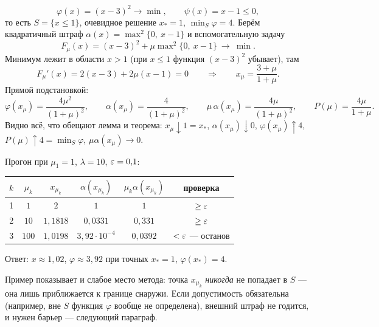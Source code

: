 \begin{example}\label{ex:penalty}
\[
  \varphi(x) = (x-3)^2 \to \min , \qquad \psi(x) = x - 1 \le 0 ,
\]
то есть $S = \{x \le 1\}$, очевидное решение $x_* = 1$,
$\min_S\varphi = 4$. Берём квадратичный штраф
$\alpha(x) = \max^2\{0,\ x-1\}$ и вспомогательную задачу
\[
  F_\mu(x) = (x-3)^2 + \mu \max\nolimits^2\{0,\ x-1\} \ \to\ \min .
\]
Минимум лежит в области $x > 1$ (при $x \le 1$ функция $(x-3)^2$ убывает), там
\[
  F_\mu'(x) = 2(x-3) + 2\mu(x-1) = 0
  \qquad\Longrightarrow\qquad
  x_\mu = \frac{3 + \mu}{1 + \mu} .
\]
Прямой подстановкой:
\[
  \varphi(x_\mu) = \frac{4\mu^2}{(1+\mu)^2} ,
  \qquad
  \alpha(x_\mu) = \frac{4}{(1+\mu)^2} ,
  \qquad
  \mu\,\alpha(x_\mu) = \frac{4\mu}{(1+\mu)^2} ,
  \qquad
  P(\mu) = \frac{4\mu}{1 + \mu} .
\]
Видно всё, что обещают лемма и теорема: $x_\mu \downarrow 1 = x_*$,
$\alpha(x_\mu) \downarrow 0$, $\varphi(x_\mu) \uparrow 4$,
$P(\mu) \uparrow 4 = \min_S\varphi$, $\mu\alpha(x_\mu) \to 0$.

\medskip
Прогон при $\mu_1 = 1$, $\lambda = 10$, $\varepsilon = 0{,}1$:
\begin{center}
\begin{tabular}{cccccc}
\toprule
$k$ & $\mu_k$ & $x_{\mu_k}$ & $\alpha(x_{\mu_k})$
    & $\mu_k \alpha(x_{\mu_k})$ & проверка \\
\midrule
1 & $1$   & $2$        & $1$              & $1$       & $\ge \varepsilon$ \\
2 & $10$  & $1{,}1818$ & $0{,}0331$       & $0{,}331$ & $\ge \varepsilon$ \\
3 & $100$ & $1{,}0198$ & $3{,}92\cdot10^{-4}$ & $0{,}0392$ & $< \varepsilon$ — останов \\
\bottomrule
\end{tabular}
\end{center}
Ответ: $x \approx 1{,}02$, $\varphi \approx 3{,}92$ при точных
$x_* = 1$, $\varphi(x_*) = 4$.
\end{example}

\begin{idea}
Пример показывает и слабое место метода: точка $x_{\mu_k}$ \emph{никогда} не
попадает в $S$ — она лишь приближается к границе снаружи. Если допустимость
обязательна (например, вне $S$ функция $\varphi$ вообще не определена),
внешний штраф не годится, и нужен барьер — следующий параграф.
\end{idea}
